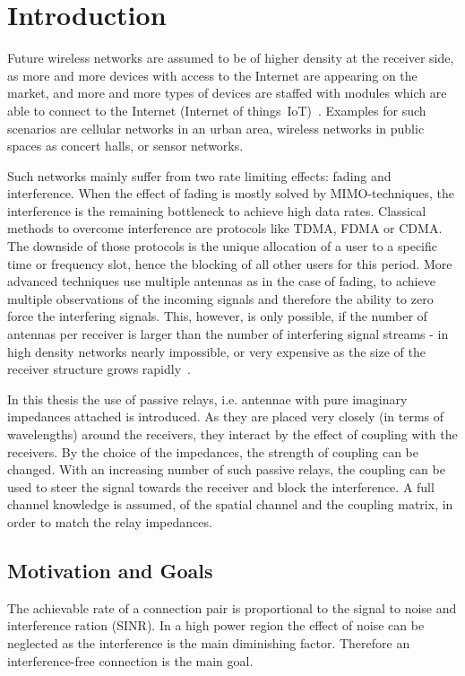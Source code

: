 \chapter{Introduction}
\label{sec:introduction}

Future wireless networks are assumed to be of higher density at the receiver side, as more and more devices with access to the Internet are appearing on the market, and more and more types of devices are staffed with modules which are able to connect to the Internet (Internet of things~IoT)~\cite{rusek13}.
Examples for such scenarios are cellular networks in an urban area, wireless networks in public spaces as concert halls, or sensor networks.

Such networks mainly suffer from two rate limiting  effects: fading and interference.
When the effect of fading is mostly solved by MIMO-techniques, the interference is the remaining bottleneck to achieve high data rates.
Classical methods to overcome interference are protocols like TDMA, FDMA or CDMA.
The downside of those protocols is the unique allocation of a user to a specific time or frequency slot, hence the blocking of all other users for this period.
More advanced techniques use multiple antennas as in the case of fading, to achieve multiple observations of the incoming signals and therefore the ability to zero force the interfering signals.
This, however, is only possible, if the number of antennas per receiver is larger than the number of interfering signal streams - in high density networks nearly impossible, or very expensive as the size of the receiver structure grows rapidly~\cite{rusek13}.

In this thesis the use of passive relays, i.e. antennae with pure imaginary impedances attached is introduced.
As they are placed very closely (in terms of wavelengths) around the receivers, they interact by the effect of coupling with the receivers.
By the choice of the impedances, the strength of coupling can be changed.
With an increasing number of such passive relays, the coupling can be used to steer the signal towards the receiver and block the interference.
A full channel knowledge is assumed, of the spatial channel and the coupling matrix, in order to match the relay impedances.

\section{Motivation and Goals}
\label{sec:motivation}

The achievable rate of a connection pair is proportional to the signal to noise and interference ration (SINR).
In a high power region the effect of noise can be neglected as the interference is the main diminishing factor.
Therefore an interference-free connection is the main goal.


